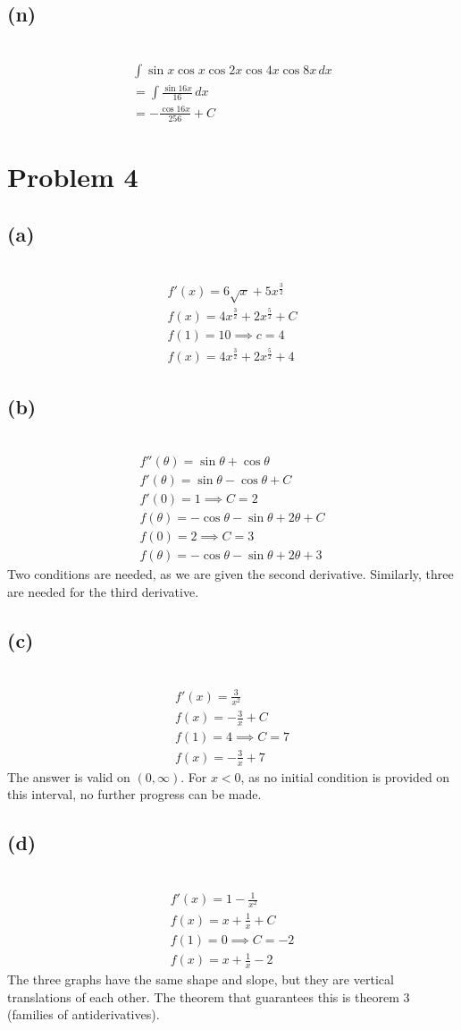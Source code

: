 \documentclass[12pt]{article}
\newcommand{\vem}{\vspace{0.5em}}
\newcommand{\problem}[1]{\section{Problem #1}}
\newcommand{\subproblem}[1]{\subsection{(#1)} \,}
\begin{document}
\subproblem{n}
\begin{gather*}
    \int \sin x \cos x \cos 2x \cos 4x \cos 8x \, dx\\
    =\int \frac{\sin 16x}{16} \, dx\\
    =\boxed{-\frac{\cos 16x}{256}+C}
\end{gather*}

\problem{4}

\subproblem{a}
\begin{gather*}
    f'(x)=6\sqrt{x}+5x^\frac{3}{2}\\
    f(x)=4x^\frac{3}{2}+2x^\frac{5}{2}+C\\
    f(1)=10 \implies c=4\\
    \boxed{f(x)=4x^\frac{3}{2}+2x^\frac{5}{2}+4}
\end{gather*}

\subproblem{b}
\begin{gather*}
    f''(\theta)=\sin \theta + \cos \theta \\
    f'(\theta )= \sin \theta -\cos \theta +C\\
    f'(0)=1 \implies C=2\\
    f(\theta )=-\cos \theta -\sin \theta +2\theta +C\\
    f(0)=2 \implies C=3\\
    \boxed{f(\theta )=-\cos \theta -\sin \theta +2\theta +3}
\end{gather*}
Two conditions are needed, as we are given the second derivative. Similarly, three are needed for the third derivative. \vem

\subproblem{c}
\begin{gather*}
    f'(x)=\frac{3}{x^2}\\
    f(x)=-\frac{3}{x}+C\\
    f(1)=4 \implies C=7\\
    \boxed{f(x)=-\frac{3}{x}+7}
\end{gather*}
The answer is valid on $(0,\infty)$. For $x<0$, as no initial condition is provided on this interval, no further progress can be made.\vem

\subproblem{d}
\begin{gather*}
    f'(x)=1-\frac{1}{x^2}\\
    f(x)=x+\frac{1}{x}+C\\
    f(1)=0 \implies C=-2\\
    \boxed{f(x)=x+\frac{1}{x}-2}
\end{gather*}
The three graphs have the same shape and slope, but they are vertical translations of each other. The theorem that guarantees this is theorem 3 (families of antiderivatives).
\end{document}
